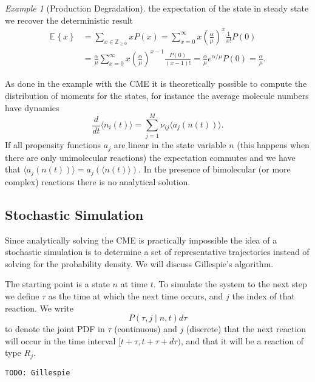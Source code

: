 \documentclass[a4paper]{article}
\newcommand{\todo}[1]{\texttt{TODO: #1}}
\newcommand{\E}[2][]{\mathbb{E}_{#1}\left\{#2\right\}}
\newcommand{\given}{\mid}
\theoremstyle{plain}
\theoremstyle{definition}
\theoremstyle{remark}
\newtheorem*{example}{Example}
\begin{document}
\begin{example}[Production Degradation]
  the expectation of the state in steady state we recover the deterministic
  result
  \begin{align*}
    \E{x} &= \sum_{x \in \mathbb{Z}_{\geq 0}} x P(x)
      = \sum_{x = 0}^\infty x \left(
        \frac{\alpha}{\mu}
      \right)^x \frac{1}{x!} P(0) \\
    &= \frac{\alpha}{\mu} \sum_{x = 0}^\infty x \left(
        \frac{\alpha}{\mu}
      \right)^{x-1} \frac{P(0)}{(x-1)!} 
    = \frac{\alpha}{\mu} e^{\alpha/\mu} P(0) = \frac{\alpha}{\mu}.
  \end{align*}
\end{example}

As done in the example with the CME it is theoretically possible to compute
the distribution of moments for the states, for instance the average molecule
numbers have dynamics
\[
  \frac{d}{dt} \langle n_i(t) \rangle = \sum_{j=1}^M \nu_{ij} \langle
  a_j(n(t)) \rangle.
\]
If all propensity functions $a_j$ are linear in the state variable $n$ (this
happens when there are only unimolecular reactions) the expectation commutes
and we have that $\langle a_j(n(t)) \rangle = a_j (\langle n(t) \rangle )$.
In the presence of bimolecular (or more complex) reactions there is no
analytical solution.

\subsection{Stochastic Simulation}

Since analytically solving the CME is practically impossible the idea of a
stochastic simulation is to determine a set of representative trajectories
instead of solving for the probability density. We will discuss Gillespie's
algorithm.

The starting point is a state $n$ at time $t$. To simulate the system to the
next step we define $\tau$ as the time at which the next time occurs, and $j$
the index of that reaction. We write
\[
  P(\tau, j \given n, t) d\tau
\]
to denote the joint PDF in $\tau$ (continuous) and $j$ (discrete) that the
next reaction will occur in the time interval $[t + \tau, t + \tau + d\tau)$,
and that it will be a reaction of type $R_j$.

\todo{Gillespie}
\end{document}
